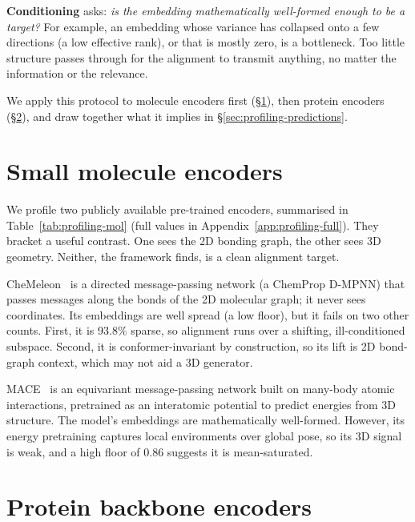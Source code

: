 \documentclass[12pt,a4paper,twoside]{report}
\begin{document}
\textbf{Conditioning} asks: \emph{is the embedding mathematically well-formed enough to be a target?} For example, an embedding whose variance has collapsed onto a few directions (a low effective rank), or that is mostly zero, is a bottleneck. Too little structure passes through for the alignment to transmit anything, no matter the information or the relevance.

We apply this protocol to molecule encoders first (\S\ref{sec:profiling-mol}), then protein encoders (\S\ref{sec:profiling-protein}), and draw together what it implies in \S\ref{sec:profiling-predictions}.

\section{Small molecule encoders}
\label{sec:profiling-mol}



We profile two publicly available pre-trained encoders, summarised in Table~\ref{tab:profiling-mol} (full values in Appendix~\ref{app:profiling-full}). They bracket a useful contrast. One sees the 2D bonding graph, the other sees 3D geometry. Neither, the framework finds, is a clean alignment target.

CheMeleon~\cite{CheMeleon} is a directed message-passing network (a ChemProp D-MPNN) that passes messages along the bonds of the 2D molecular graph; it never sees coordinates. Its embeddings are well spread (a low floor), but it fails on two other counts. First, it is 93.8\% sparse, so alignment runs over a shifting, ill-conditioned subspace. Second, it is conformer-invariant by construction, so its lift is 2D bond-graph context, which may not aid a 3D generator.

MACE~\cite{MACE} is an equivariant message-passing network built on many-body atomic interactions, pretrained as an interatomic potential to predict energies from 3D structure. The model's embeddings are mathematically well-formed. However, its energy pretraining captures local environments over global pose, so its 3D signal is weak, and a high floor of 0.86 suggests it is mean-saturated.

\section{Protein backbone encoders}
\label{sec:profiling-protein}


\end{document}
